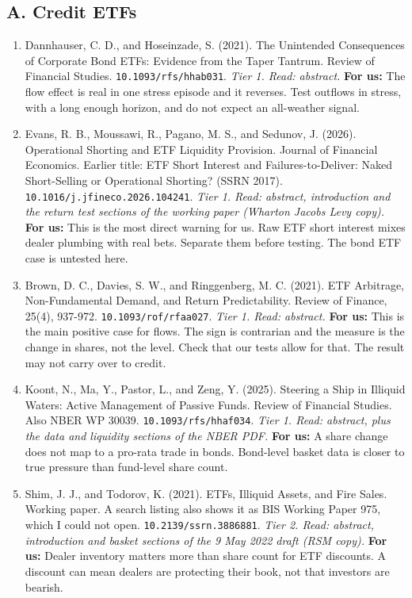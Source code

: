 \subsection*{A. Credit ETFs}
\begin{enumerate}[leftmargin=*,itemsep=3pt]
\item Dannhauser, C. D., and Hoseinzade, S. (2021). The Unintended Consequences of Corporate Bond ETFs: Evidence from the Taper Tantrum. Review of Financial Studies. \nolinkurl{10.1093/rfs/hhab031}. \emph{Tier 1. Read: abstract.} \textbf{For us:} The flow effect is real in one stress episode and it reverses. Test outflows in stress, with a long enough horizon, and do not expect an all-weather signal.
\item Evans, R. B., Moussawi, R., Pagano, M. S., and Sedunov, J. (2026). Operational Shorting and ETF Liquidity Provision. Journal of Financial Economics. Earlier title: ETF Short Interest and Failures-to-Deliver: Naked Short-Selling or Operational Shorting? (SSRN 2017). \nolinkurl{10.1016/j.jfineco.2026.104241}. \emph{Tier 1. Read: abstract, introduction and the return test sections of the working paper (Wharton Jacobs Levy copy).} \textbf{For us:} This is the most direct warning for us. Raw ETF short interest mixes dealer plumbing with real bets. Separate them before testing. The bond ETF case is untested here.
\item Brown, D. C., Davies, S. W., and Ringgenberg, M. C. (2021). ETF Arbitrage, Non-Fundamental Demand, and Return Predictability. Review of Finance, 25(4), 937-972. \nolinkurl{10.1093/rof/rfaa027}. \emph{Tier 1. Read: abstract.} \textbf{For us:} This is the main positive case for flows. The sign is contrarian and the measure is the change in shares, not the level. Check that our tests allow for that. The result may not carry over to credit.
\item Koont, N., Ma, Y., Pastor, L., and Zeng, Y. (2025). Steering a Ship in Illiquid Waters: Active Management of Passive Funds. Review of Financial Studies. Also NBER WP 30039. \nolinkurl{10.1093/rfs/hhaf034}. \emph{Tier 1. Read: abstract, plus the data and liquidity sections of the NBER PDF.} \textbf{For us:} A share change does not map to a pro-rata trade in bonds. Bond-level basket data is closer to true pressure than fund-level share count.
\item Shim, J. J., and Todorov, K. (2021). ETFs, Illiquid Assets, and Fire Sales. Working paper. A search listing also shows it as BIS Working Paper 975, which I could not open. \nolinkurl{10.2139/ssrn.3886881}. \emph{Tier 2. Read: abstract, introduction and basket sections of the 9 May 2022 draft (RSM copy).} \textbf{For us:} Dealer inventory matters more than share count for ETF discounts. A discount can mean dealers are protecting their book, not that investors are bearish.

\end{enumerate}
